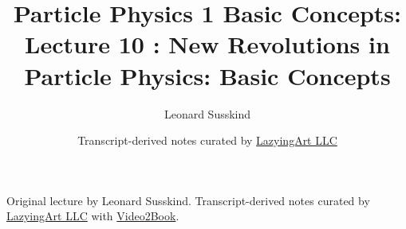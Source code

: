 \documentclass[11pt,oneside]{book}
\begin{document}
\frontmatter
\title{Particle Physics 1 Basic Concepts: Lecture 10 : New Revolutions in Particle Physics: Basic Concepts}
\author{Leonard Susskind}
\date{Transcript-derived notes curated by \href{https://lazying.art}{LazyingArt LLC}}
\maketitle
\begin{center}
\small Original lecture by Leonard Susskind. Transcript-derived notes curated by \href{https://lazying.art}{LazyingArt LLC} with \href{https://github.com/lachlanchen/Video2Book}{Video2Book}.
\end{center}
\clearpage
\mainmatter

\end{document}

